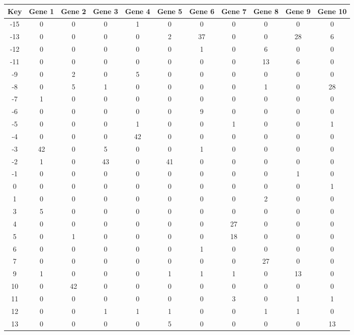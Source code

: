 \begin{tabular}{|c|c|c|c|c|c|c|c|c|c|c|}
\hline
Key & Gene 1 & Gene 2 & Gene 3 & Gene 4 & Gene 5 & Gene 6 & Gene 7 & Gene 8 & Gene 9 & Gene 10 \\
\hline
-15 & 0 & 0 & 0 & 1 & 0 & 0 & 0 & 0 & 0 & 0 \\
-13 & 0 & 0 & 0 & 0 & 2 & 37 & 0 & 0 & 28 & 6 \\
-12 & 0 & 0 & 0 & 0 & 0 & 1 & 0 & 6 & 0 & 0 \\
-11 & 0 & 0 & 0 & 0 & 0 & 0 & 0 & 13 & 6 & 0 \\
-9 & 0 & 2 & 0 & 5 & 0 & 0 & 0 & 0 & 0 & 0 \\
-8 & 0 & 5 & 1 & 0 & 0 & 0 & 0 & 1 & 0 & 28 \\
-7 & 1 & 0 & 0 & 0 & 0 & 0 & 0 & 0 & 0 & 0 \\
-6 & 0 & 0 & 0 & 0 & 0 & 9 & 0 & 0 & 0 & 0 \\
-5 & 0 & 0 & 0 & 1 & 0 & 0 & 1 & 0 & 0 & 1 \\
-4 & 0 & 0 & 0 & 42 & 0 & 0 & 0 & 0 & 0 & 0 \\
-3 & 42 & 0 & 5 & 0 & 0 & 1 & 0 & 0 & 0 & 0 \\
-2 & 1 & 0 & 43 & 0 & 41 & 0 & 0 & 0 & 0 & 0 \\
-1 & 0 & 0 & 0 & 0 & 0 & 0 & 0 & 0 & 1 & 0 \\
0 & 0 & 0 & 0 & 0 & 0 & 0 & 0 & 0 & 0 & 1 \\
1 & 0 & 0 & 0 & 0 & 0 & 0 & 0 & 2 & 0 & 0 \\
3 & 5 & 0 & 0 & 0 & 0 & 0 & 0 & 0 & 0 & 0 \\
4 & 0 & 0 & 0 & 0 & 0 & 0 & 27 & 0 & 0 & 0 \\
5 & 0 & 1 & 0 & 0 & 0 & 0 & 18 & 0 & 0 & 0 \\
6 & 0 & 0 & 0 & 0 & 0 & 1 & 0 & 0 & 0 & 0 \\
7 & 0 & 0 & 0 & 0 & 0 & 0 & 0 & 27 & 0 & 0 \\
9 & 1 & 0 & 0 & 0 & 1 & 1 & 1 & 0 & 13 & 0 \\
10 & 0 & 42 & 0 & 0 & 0 & 0 & 0 & 0 & 0 & 0 \\
11 & 0 & 0 & 0 & 0 & 0 & 0 & 3 & 0 & 1 & 1 \\
12 & 0 & 0 & 1 & 1 & 1 & 0 & 0 & 1 & 1 & 0 \\
13 & 0 & 0 & 0 & 0 & 5 & 0 & 0 & 0 & 0 & 13 \\
\hline
\end{tabular}